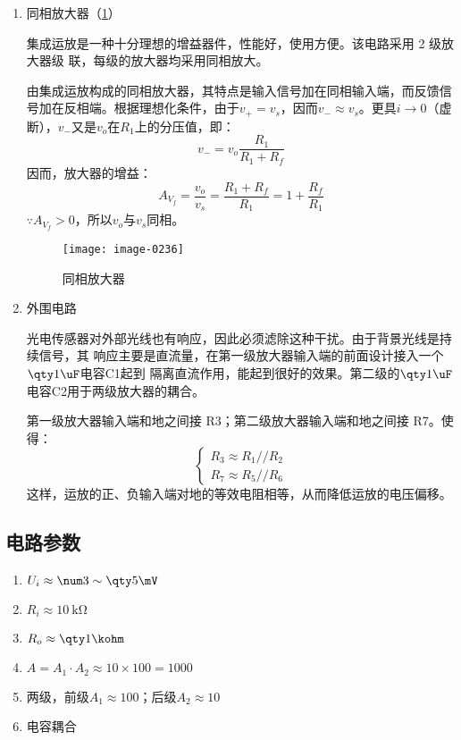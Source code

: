 \begin{enumerate}
  \item 同相放大器\cite{cn10}（\cref{4-3}）
  
  集成运放是一种十分理想的增益器件，性能好，使用方便。该电路采用 2 级放大器级
  联，每级的放大器均采用同相放大。

  由集成运放构成的同相放大器，其特点是输入信号加在同相输入端，而反馈信号加在反相端。根据理想化条件，由于$v_+=v_s$，因而$v_-\approx v_s$。更具$i\to0$（虚断），$v_-$又是$v_o$在$R_1$上的分压值，即：
  \begin{equation}
    v_-=v_o\frac{R_1}{R_1+R_f}
  \end{equation}
  因而，放大器的增益：
  \begin{equation}
    A_{V_f}=\frac{v_o}{v_s}=\frac{R_1+R_f}{R_1}=1+\frac{R_f}{R_1}
  \end{equation}
  $\because A_{V_f}>0$，所以$v_o$与$v_s$同相。
  
  \begin{figure}[htbp]
    \centering
    \texttt{[image: image-0236]}
    \caption{同相放大器}
    \label{4-3}
  \end{figure}
  \item 外围电路
  
  光电传感器对外部光线也有响应，因此必须滤除这种干扰。由于背景光线是持续信号，其
  响应主要是直流量，在第一级放大器输入端的前面设计接入一个$\qty1\uF$电容C1起到
  隔离直流作用，能起到很好的效果。第二级的$\qty1\uF$电容C2用于两级放大器的耦合。

  第一级放大器输入端和地之间接 R3；第二级放大器输入端和地之间接 R7。使得：
  \begin{equation}
    \begin{cases}
      R_3\approx R_1//R_2\\
      R_7\approx R_5//R_6
    \end{cases}
  \end{equation}
  这样，运放的正、负输入端对地的等效电阻相等，从而降低运放的电压偏移。
\end{enumerate}

\subsection{电路参数}

\begin{enumerate}
  \item {} $U_i\approx\num3\sim\qty5\mV$
  \item {} $R_i\approx\qty{10}\kohm$
  \item {} $R_o\approx\qty1\kohm$
  \item {} $A=A_1\cdot A_2\approx10\times100=1000$
  \item {} 两级，前级$A_1\approx100$；后级$A_2\approx10$
  \item {} 电容耦合
\end{enumerate}

